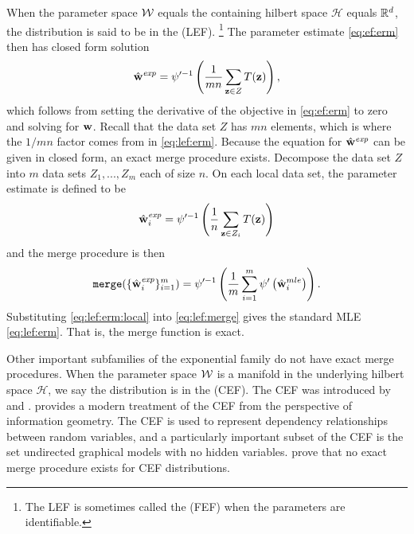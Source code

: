 \documentclass[thesis.tex]{subfiles}
\newcommand{\set}[1]{\mathcal {#1}}
\newcommand{\merge}{\mkprocedure{merge}}
\newcommand{\wexp}{\hat\w^\textit{exp}}
\begin{document}
When the parameter space ${\mathcal W}$ equals the containing hilbert space $\set H$ equals $\mathbb R^d$,
the distribution is said to be in the  (LEF).%
\footnote{The LEF is sometimes called the  (FEF) when the parameters are identifiable.}
The parameter estimate \eqref{eq:ef:erm} then has closed form solution
\begin{equation}
    \label{eq:lef:erm}
    \wexp
    = \psi'^{-1} \left(\frac{1}{mn} \sum_{\z\in Z} T(\z) \right)
    ,
\end{equation}
which follows from setting the derivative of the objective in \eqref{eq:ef:erm} to zero and solving for $\mathbf w$.
Recall that the data set $Z$ has $mn$ elements,
which is where the $1/mn$ factor comes from in \eqref{eq:lef:erm}.
Because the equation for $\wexp$ can be given in closed form,
an exact merge procedure exists.
Decompose the data set $Z$ into $m$ data sets $Z_1,...,Z_m$ each of size $n$.
On each local data set, the parameter estimate is defined to be
\begin{equation}
    \label{eq:lef:erm:local}
    \wexp_i
    = \psi'^{-1} \left(\frac{1}{n} \sum_{\z\in Z_i} T(\z) \right)
\end{equation}
and the merge procedure is then
\begin{equation}
    \label{eq:lef:merge}
    \merge(\{\wexp_i\}_{i=1}^m)
    =
    \psi'^{-1} 
    \left(
        \frac{1}{m} \sum_{i=1}^m \psi' \left(\wmle_i\right)
    \right)
    .
\end{equation}
Substituting \eqref{eq:lef:erm:local} into \eqref{eq:lef:merge} gives the standard MLE \eqref{eq:lef:erm}.
That is, the merge function is exact.

Other important subfamilies of the exponential family do not have exact merge procedures.
When the parameter space ${\mathcal W}$ is a manifold in the underlying hilbert space $\set H$,
we say the distribution is in the  (CEF). 
The CEF was introduced by \citet{efron1975defining} and \citet{amari1982differential}.
\citet{amari2016information} provides a modern treatment of the CEF from the perspective of information geometry.
The CEF is used to represent dependency relationships between random variables,
and a particularly important subset of the CEF is the set undirected graphical models with no hidden variables.
\citet{liu2012distributed} prove that no exact merge procedure exists for CEF distributions.
\end{document}
